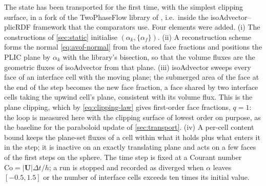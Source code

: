 \documentclass[preprint,12pt]{elsarticle}
\begin{document}
The state has been transported for the first time, with the simplest clipping surface, in a fork of the TwoPhaseFlow library of \citet{ScheuflerRoenby2023TwoPhaseFlow}, i.e.\ inside the isoAdvector--plicRDF framework \citep{RoenbyEtAl2016,ScheuflerRoenby2019} that the comparators use. Four elements were added. (i) The constructions of \cref{sec:static} initialise $(\alpha_k, \{\alpha_f\})$. (ii) A reconstruction scheme forms the normal \cref{eq:avof-normal} from the stored face fractions and positions the PLIC plane by $\alpha_k$ with the library's bisection, so that the volume fluxes are the geometric fluxes of isoAdvector from that plane. (iii) isoAdvector sweeps every face of an interface cell with the moving plane; the submerged area of the face at the end of the step becomes the new face fraction, a face shared by two interface cells taking the upwind cell's plane, consistent with its volume flux. This is the plane clipping, which by \cref{eq:clipping-law} gives first-order face fractions, $q = 1$: the loop is measured here with the clipping surface of lowest order on purpose, as the baseline for the paraboloid update of \cref{sec:transport}. (iv) A per-cell content bound keeps the plane-set fluxes of a cell within what it holds plus what enters it in the step; it is inactive on an exactly translating plane and acts on a few faces of the first steps on the sphere. The time step is fixed at a Courant number $\mathrm{Co} = |\mathbf{U}|\Delta t/h$; a run is stopped and recorded as diverged when $\alpha$ leaves $[-0.5, 1.5]$ or the number of interface cells exceeds ten times its initial value.
\end{document}
